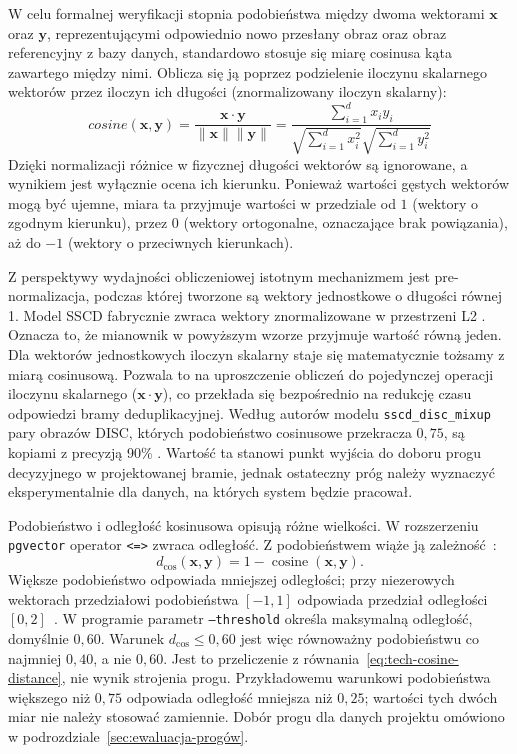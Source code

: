 W celu formalnej weryfikacji stopnia podobieństwa między dwoma wektorami $\mathbf{x}$ oraz $\mathbf{y}$, reprezentującymi odpowiednio nowo przesłany obraz oraz obraz referencyjny z bazy danych, standardowo stosuje się miarę cosinusa kąta zawartego między nimi\cite{jm3}. Oblicza się ją poprzez podzielenie iloczynu skalarnego wektorów przez iloczyn ich długości (znormalizowany iloczyn skalarny)\cite{jm3}:
$$cosine(\mathbf{x},\mathbf{y}) = \frac{\mathbf{x} \cdot \mathbf{y}}{\|\mathbf{x}\|\|\mathbf{y}\|} = \frac{\sum_{i=1}^{d} x_i y_i}{\sqrt{\sum_{i=1}^{d} x_i^2} \sqrt{\sum_{i=1}^{d} y_i^2}}$$
Dzięki normalizacji różnice w fizycznej długości wektorów są ignorowane, a wynikiem jest wyłącznie ocena ich kierunku\cite{jm3}. Ponieważ wartości gęstych wektorów mogą być ujemne, miara ta przyjmuje wartości w przedziale od $1$ (wektory o zgodnym kierunku), przez $0$ (wektory ortogonalne, oznaczające brak powiązania), aż do $-1$ (wektory o przeciwnych kierunkach)\cite{jm3}.


Z perspektywy wydajności obliczeniowej istotnym mechanizmem jest pre-normalizacja, podczas której tworzone są wektory jednostkowe o długości równej 1\cite{jm3}. Model SSCD fabrycznie zwraca wektory znormalizowane w przestrzeni L2 \cite{sscd_repo}. Oznacza to, że mianownik w powyższym wzorze przyjmuje wartość równą jeden. Dla wektorów jednostkowych iloczyn skalarny staje się matematycznie tożsamy z miarą cosinusową\cite{jm3}. Pozwala to na uproszczenie obliczeń do pojedynczej operacji iloczynu skalarnego ($\mathbf{x} \cdot \mathbf{y}$), co przekłada się bezpośrednio na redukcję czasu odpowiedzi bramy deduplikacyjnej. Według autorów modelu \texttt{sscd\_disc\_mixup} pary obrazów DISC, których podobieństwo cosinusowe przekracza $0{,}75$, są kopiami z precyzją 90\% \cite{sscd_repo}. Wartość ta stanowi punkt wyjścia do doboru progu decyzyjnego w projektowanej bramie, jednak ostateczny próg należy wyznaczyć eksperymentalnie dla danych, na których system będzie pracował.

Podobieństwo i odległość kosinusowa opisują różne wielkości. W rozszerzeniu \texttt{pgvector} operator \texttt{<=>} zwraca odległość. Z podobieństwem wiąże ją zależność~\cite{pgvector_docs}:
\begin{equation}
\label{eq:tech-cosine-distance}
d_{\cos}(\mathbf{x},\mathbf{y})
=1-\operatorname{cosine}(\mathbf{x},\mathbf{y}).
\end{equation}
Większe podobieństwo odpowiada mniejszej odległości; przy niezerowych wektorach przedziałowi podobieństwa \([-1,1]\) odpowiada przedział odległości \([0,2]\)~\cite{jm3,pgvector_docs}. W programie parametr \texttt{--threshold} określa maksymalną odległość, domyślnie \(0{,}60\). Warunek \(d_{\cos}\leq0{,}60\) jest więc równoważny podobieństwu co najmniej \(0{,}40\), a nie \(0{,}60\). Jest to przeliczenie z równania~\eqref{eq:tech-cosine-distance}, nie wynik strojenia progu. Przykładowemu warunkowi podobieństwa większego niż \(0{,}75\) odpowiada odległość mniejsza niż \(0{,}25\); wartości tych dwóch miar nie należy stosować zamiennie. Dobór progu dla danych projektu omówiono w podrozdziale~\ref{sec:ewaluacja-progów}.

